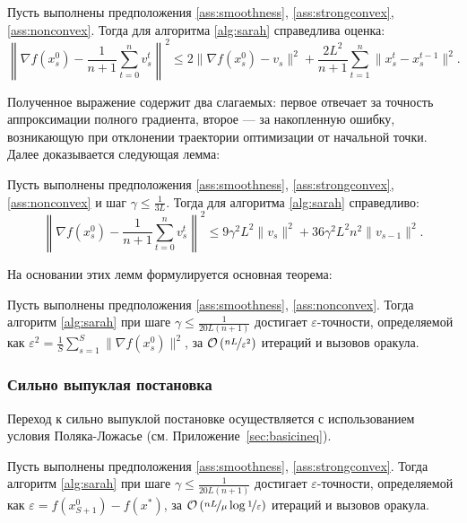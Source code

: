 \begin{lemma}\label{l1:sarahmain}
    Пусть выполнены предположения \ref{ass:smoothness}, \ref{ass:strongconvex}, \ref{ass:nonconvex}. Тогда для алгоритма \ref{alg:sarah} справедлива оценка:
    \[
    \left\| \nabla f(x_s^0) - \frac{1}{n+1}\sum\limits_{t=0}^n v_s^t\right\|^2 \leqslant 2\|\nabla f(x_{s}^0) - v_s \|^2 + \frac{2L^2}{n+1}\sum\limits_{t=1}^n \|x_s^t - x_s^{t-1}\|^2.
    \]
\end{lemma}

Полученное выражение содержит два слагаемых: первое отвечает за точность аппроксимации полного градиента, второе — за накопленную ошибку, возникающую при отклонении траектории оптимизации от начальной точки. Далее доказывается следующая лемма:

\begin{lemma}\label{l2:sarahmain}
    Пусть выполнены предположения \ref{ass:smoothness}, \ref{ass:strongconvex}, \ref{ass:nonconvex} и шаг $\gamma \leqslant \frac{1}{3L}$. Тогда для алгоритма \ref{alg:sarah} справедливо:
    \[
    \left\| \nabla f(x_s^0) - \frac{1}{n+1}\sum\limits_{t=0}^n v_s^t\right\|^2 \leqslant 9\gamma^2L^2\|v_{s}\|^2 + 36\gamma^2L^2n^2\|v_{s-1}\|^2.
    \]
\end{lemma}

На основании этих лемм формулируется основная теорема:

\begin{theorem}\label{th1:sarahmain}
   Пусть выполнены предположения \ref{ass:smoothness}, \ref{ass:nonconvex}. Тогда алгоритм \ref{alg:sarah} при шаге $\gamma\leqslant\frac{1}{20L(n+1)}$ достигает $\varepsilon$-точности, определяемой как $\varepsilon^2 = \frac{1}{S}\sum\limits_{s=1}^{S} \|\nabla f(x_s^0)\|^2$, за $\mathcal{O} \left(\nicefrac{nL}{\varepsilon^2}\right)$ итераций и вызовов оракула.
\end{theorem}

\subsubsection{Сильно выпуклая постановка}\label{subsection:sarahstringlyconvex}

Переход к сильно выпуклой постановке осуществляется с использованием условия Поляка-Ложасье (см. Приложение~\ref{sec:basicineq}).

\begin{theorem}\label{th2:sarahmain}
    Пусть выполнены предположения \ref{ass:smoothness}, \ref{ass:strongconvex}. Тогда алгоритм \ref{alg:sarah} при шаге $\gamma\leqslant\frac{1}{20L(n+1)}$ достигает $\varepsilon$-точности, определяемой как $\varepsilon = f(x_{S+1}^0)-f(x^*)$, за $\mathcal{O} \left(\nicefrac{nL}{\mu}\log \nicefrac{1}{\varepsilon}\right)$ итераций и вызовов оракула.
\end{theorem}
